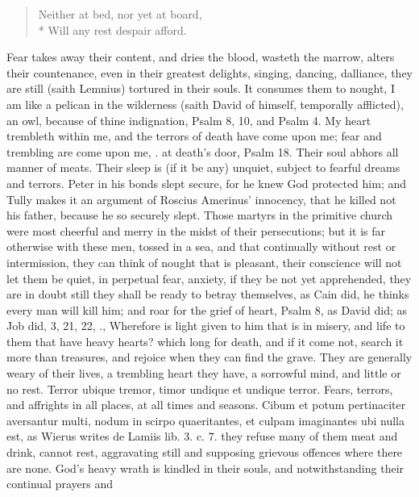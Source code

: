 {\begin{verse}
Neither at bed, nor yet at board,\\*
Will any rest despair afford.
\end{verse}

Fear takes away their content, and dries the blood, wasteth the marrow,
alters their countenance, even in their greatest delights, singing,
dancing, dalliance, they are still (saith Lemnius) tortured in
their souls. It consumes them to nought, I am like a pelican in the
wilderness (saith David of himself, temporally afflicted), an owl,
because of thine indignation, Psalm  8, 10, and Psalm  4. My
heart trembleth within me, and the terrors of death have come upon me;
fear and trembling are come upon me, \etc{}. at death's door, Psalm 
18. Their soul abhors all manner of meats. Their sleep is (if it
be any) unquiet, subject to fearful dreams and terrors. Peter in his
bonds slept secure, for he knew God protected him; and Tully makes it
an argument of Roscius Amerinus' innocency, that he killed not his
father, because he so securely slept. Those martyrs in the primitive
church were most cheerful and merry in the midst of their
persecutions; but it is far otherwise with these men, tossed in a sea,
and that continually without rest or intermission, they can think of
nought that is pleasant, their conscience will not let them be
quiet, in perpetual fear, anxiety, if they be not yet apprehended, they
are in doubt still they shall be ready to betray themselves, as Cain
did, he thinks every man will kill him; and roar for the grief of
heart, Psalm  8, as David did; as Job did,  3, 21, 22, \etc{}.,
Wherefore is light given to him that is in misery, and life to them
that have heavy hearts? which long for death, and if it come not,
search it more than treasures, and rejoice when they can find the
grave. They are generally weary of their lives, a trembling heart they
have, a sorrowful mind, and little or no rest. Terror ubique tremor,
timor undique et undique terror. Fears, terrors, and affrights in all
places, at all times and seasons. Cibum et potum pertinaciter
aversantur multi, nodum in scirpo quaeritantes, et culpam imaginantes
ubi nulla est, as Wierus writes de Lamiis lib. 3. c. 7. they refuse
many of them meat and drink, cannot rest, aggravating still and
supposing grievous offences where there are none. God's heavy wrath is
kindled in their souls, and notwithstanding their continual prayers and
}
